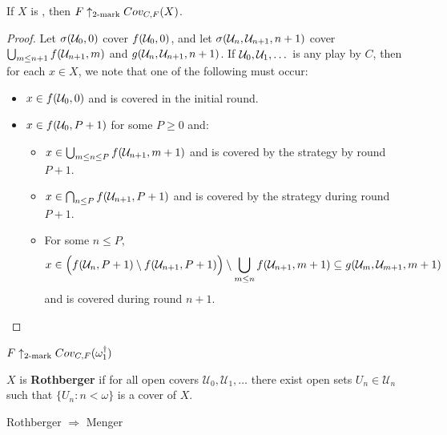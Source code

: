   \begin{theorem}
    If $X$ is \scish, then $F \uparrow_{2\text{-mark}}Cov_{C,F}(X)$.
  \end{theorem}

  \begin{proof}
    Let $\sigma(\mathcal{U}_0,0)$ cover $f(\mathcal{U}_0,0)$, and let $\sigma(\mathcal{U}_n,\mathcal{U}_{n+1},n+1)$ cover $\bigcup_{m\leq n+1}f(\mathcal{U}_{n+1},m)$ and $g(\mathcal{U}_n,\mathcal{U}_{n+1},n+1)$. If $\mathcal{U}_0,\mathcal{U}_1,\dots$ is any play by $C$, then for each $x\in X$, we note that one of the following must occur:
      \begin{itemize}
        \item $x \in f(\mathcal{U}_0,0)$ and is covered in the initial round.
        \item $x \in f(\mathcal{U}_0,P+1)$ for some $P\geq 0$ and:
        \begin{itemize}
          \item $x\in \bigcup_{m\leq n\leq P} f(\mathcal{U}_{n+1},m+1)$ and is covered by the strategy by round $P+1$.
          \item $x\in \bigcap_{n\leq P} f(\mathcal{U}_{n+1},P+1)$ and is covered by the strategy during round $P+1$.
          \item For some $n \leq P$, 
            \[x \in \Big( f(\mathcal{U}_{n},P+1)\setminus f(\mathcal{U}_{n+1},P+1) \Big)\setminus \bigcup_{m\leq n} f(\mathcal{U}_{n+1},m+1) \subseteq g(\mathcal{U}_m,\mathcal{U}_{m+1},m+1)\]
           and is covered during round $n+1$.
         \end{itemize}
      \end{itemize}
  \end{proof}

  \begin{corollary}
    $F\uparrow_{2\text{-mark}}Cov_{C,F}(\omega_1^\dagger)$
  \end{corollary}











  \newpage

  \begin{definition}
    $X$ is \textbf{Rothberger} if for all open covers $\mathcal{U}_0,\mathcal{U}_1,\dots$ there exist open sets $U_n\in \mathcal{U}_n$ such that $\{U_n:n<\omega\}$ is a cover of $X$.
  \end{definition}

  \begin{proposition}
    Rothberger $\Rightarrow$ Menger
  \end{proposition}

